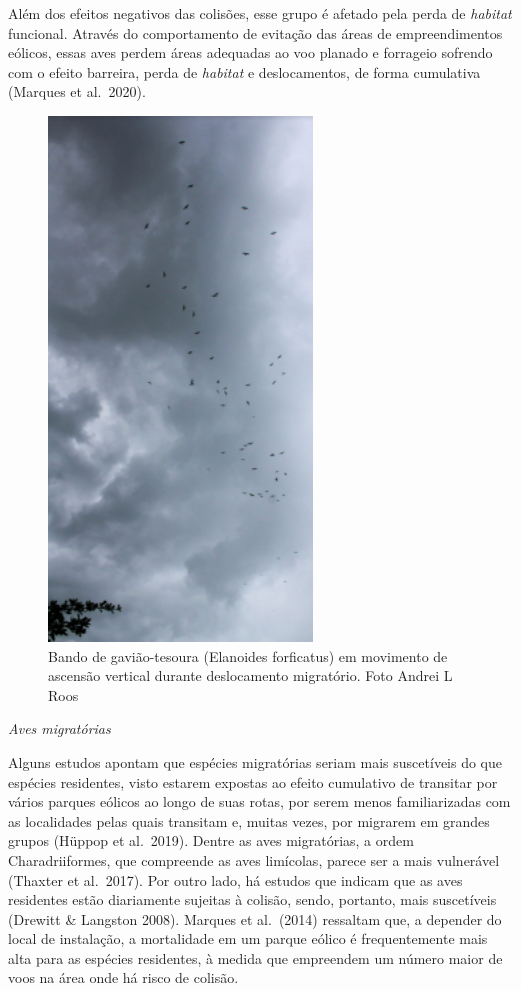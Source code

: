 \documentclass[
  oneside]{scrbook}
\begin{document}
Além dos efeitos negativos das colisões, esse grupo é afetado pela perda de \emph{habitat} funcional. Através do comportamento de evitação das áreas de empreendimentos eólicos, essas aves perdem áreas adequadas ao voo planado e forrageio sofrendo com o efeito barreira, perda de \emph{habitat} e deslocamentos, de forma cumulativa (Marques et al.~2020).

\begin{figure}[H]

{\centering \includegraphics[width=0.4\linewidth]{imagens/cap04/Figura_4.3} 

}

\caption{Bando de gavião-tesoura (Elanoides forficatus) em movimento de ascensão vertical durante deslocamento migratório. Foto Andrei L Roos}\label{fig:14}
\end{figure}

\emph{Aves migratórias}

Alguns estudos apontam que espécies migratórias seriam mais suscetíveis do que espécies residentes, visto estarem expostas ao efeito cumulativo de transitar por vários parques eólicos ao longo de suas rotas, por serem menos familiarizadas com as localidades pelas quais transitam e, muitas vezes, por migrarem em grandes grupos (Hüppop et al.~2019). Dentre as aves migratórias, a ordem Charadriiformes, que compreende as aves limícolas, parece ser a mais vulnerável (Thaxter et al.~2017). Por outro lado, há estudos que indicam que as aves residentes estão diariamente sujeitas à colisão, sendo, portanto, mais suscetíveis (Drewitt \& Langston 2008). Marques et al.~(2014) ressaltam que, a depender do local de instalação, a mortalidade em um parque eólico é frequentemente mais alta para as espécies residentes, à medida que empreendem um número maior de voos na área onde há risco de colisão.
\end{document}
